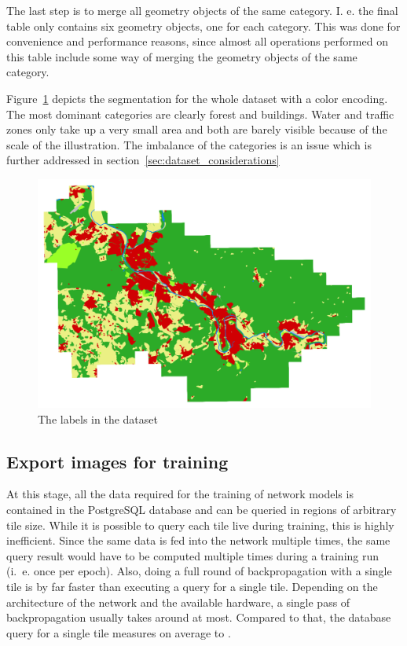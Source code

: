 The last step is to merge all geometry objects of the same category. I. e. the final table only contains six geometry objects, one for each category. This was done for convenience and performance reasons, since almost all operations performed on this table include some way of merging the geometry objects of the same category.

Figure~\ref{fig:dop_label_all} depicts the segmentation for the whole dataset with a color encoding. The most dominant categories are clearly forest and buildings. Water and traffic zones only take up a very small area and both are barely visible because of the scale of the illustration. The imbalance of the categories is an issue which is further addressed in section~\ref{sec:dataset_considerations}

\begin{figure}[h]
    \centering
    \includegraphics[width=\textwidth]{images/dop_label_all}
    \caption{The labels in the dataset}
    \label{fig:dop_label_all}
\end{figure}

\subsection{Export images for training}
\label{sec:image_export}
At this stage, all the data required for the training of network models is contained in the PostgreSQL database and can be queried in regions of arbitrary tile size. While it is possible to query each tile live during training, this is highly inefficient. Since the same data is fed into the network multiple times, the same query result would have to be computed multiple times during a training run (i.~e. once per epoch). Also, doing a full round of backpropagation with a single tile is by far faster than executing a query for a single tile. Depending on the architecture of the network and the available hardware, a single pass of backpropagation usually takes around  at most. Compared to that, the database query for a single tile measures on average to .

